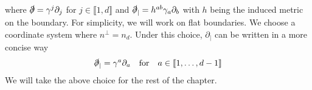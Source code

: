 where $\slashed{\partial} = \gamma^j\partial_j$ for
$j \in \llbracket 1 , d \rrbracket$ and $\slashed{\partial}_| = h^{ab} \gamma_{a} \partial_{b}$ with $h$ being the induced metric on the boundary.
For simplicity, we will work on flat boundaries.
We choose a coordinate system where $n^\perp = n_d$.
Under this choice,
$\partial_|$ can be written in a more concise way
\begin{equation*}
\slashed \partial_| = \gamma^a\partial_a \quad\mathrm{for}\quad 
a \in \llbracket 1, \ldots, d-1 \rrbracket
\end{equation*}
We will take the above choice for the rest of the chapter. 





